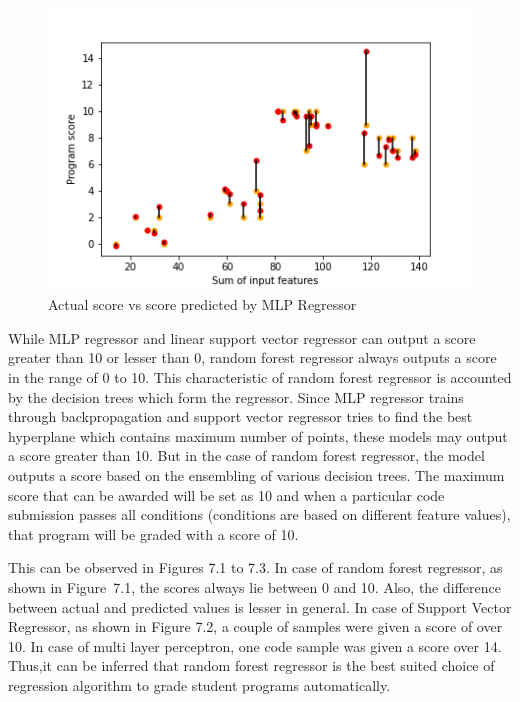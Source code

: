 \begin{figure}[H]
\centering
\includegraphics[scale=1.0]{./figures/ss_mlp.png}
\caption{Actual score vs score predicted by MLP Regressor}
\label{fig_rf}
\end{figure}

While MLP regressor and linear support vector
regressor can output a score greater than 10 or lesser than 0, random
forest regressor always outputs a score in the range of 0 to 10. This
characteristic of random forest regressor is accounted by the decision
trees which form the regressor. Since MLP regressor trains through
backpropagation and support vector regressor tries to find the best
hyperplane which contains maximum number of points, these models may
output a score greater than 10. But in the case of random forest
regressor, the model outputs a score based on the ensembling of
various decision trees. The maximum score that can be awarded will be
set as 10 and when a particular code submission passes all conditions
(conditions are based on different feature values), that program will
be graded with a score of 10.

This can be observed in Figures 7.1 to 7.3. In case of random forest
regressor, as shown in Figure~7.1, the scores always lie between 0 and
10. Also, the difference between actual and predicted values is lesser
in general. In case of Support Vector Regressor, as shown in Figure
7.2, a couple of samples were given a score of over 10. In case of
multi layer perceptron, one code sample was given a score over 14.
Thus,it can be inferred that random forest regressor is the best suited choice of regression algorithm to grade student programs automatically.

